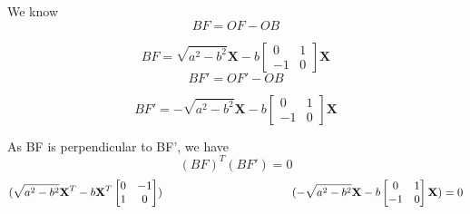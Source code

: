 \documentclass{beamer}
\begin{document}
\begin{frame}
We know
\newline
\[BF = OF - OB\]

\implies
 \[BF =  \sqrt{a^{2}-b^{2}} \textbf{X} - b\begin{bmatrix}
0 & 1 \\
-1 & 0
\end{bmatrix}\textbf{X} \]
\newline
\newline
\[BF' = OF' - OB\]

\implies
\[BF' =  -\sqrt{a^{2}-b^{2}} \textbf{X} - b\begin{bmatrix}
0 & 1 \\
-1 & 0
\end{bmatrix}\textbf{X} \] 





\end{frame}
\begin{frame}
As BF is perpendicular to BF', we have
\[(BF)^{T}(BF') = 0\]
\newline
\implies
\[(\sqrt{a^{2}-b^{2}}\textbf{X}^{T} - b\textbf{X}^{T}\begin{bmatrix}
0 & -1 \\
1 & 0
\end{bmatrix})

\hspace{40mm}(-\sqrt{a^{2}-b^{2}}\textbf{X} - b\begin{bmatrix}
0 & 1 \\
-1 & 0
\end{bmatrix}\textbf{X}) = 0\]
\end{frame}
\end{document}
